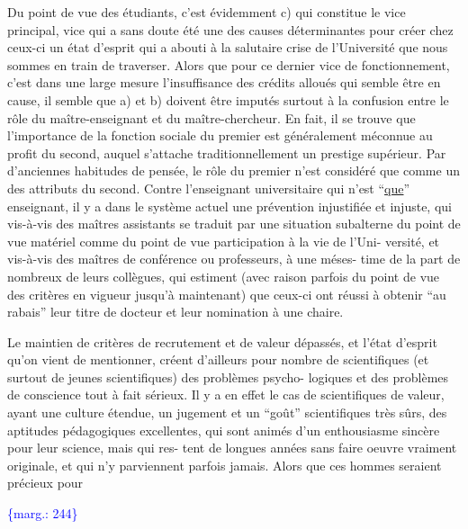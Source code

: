 \documentclass[11pt]{article}
\newcommand{\scanpage}[1]{\par\bigskip\noindent{\small\sffamily[scan #1]}\par}
\newcommand{\mspage}[1]{{\small\sffamily[p.\,#1]}}
\newcommand{\margin}[1]{\textcolor{blue}{\{\textsf{marg.:} #1\}}}
\newcommand{\uline}[1]{\underline{#1}}
\begin{document}
Du point de vue des étudiants, c'est évidemment c) qui constitue
le vice principal, vice qui a sans doute été une des causes déterminantes
pour créer chez ceux-ci un état d'esprit qui a abouti à la salutaire crise
de l'Université que nous sommes en train de traverser. Alors que pour ce
dernier vice de fonctionnement, c'est dans une large mesure l'insuffisance
des crédits alloués qui semble être en cause, il semble que a) et b) doivent
être imputés surtout à la confusion entre le rôle du maître-enseignant et du
maître-chercheur. En fait, il se trouve que l'importance de la fonction
sociale du premier est généralement méconnue au profit du second, auquel
s'attache traditionnellement un prestige supérieur. Par d'anciennes habitudes
de pensée, le rôle du premier n'est considéré que comme un des attributs du
second. Contre l'enseignant universitaire qui n'est ``\uline{que}'' enseignant, il
y a dans le système actuel une prévention injustifiée et injuste, qui
vis-à-vis des maîtres assistants se traduit par une situation subalterne du
point de vue matériel comme du point de vue participation à la vie de l'Uni-%
versité, et vis-à-vis des maîtres de conférence ou professeurs, à une méses-%
time de la part de nombreux de leurs collègues, qui estiment (avec raison
parfois du point de vue des critères en vigueur jusqu'à maintenant) que
ceux-ci ont réussi à obtenir ``au rabais'' leur titre de docteur et leur
nomination à une chaire.

Le maintien de critères de recrutement et de valeur dépassés, et
l'état d'esprit qu'on vient de mentionner, créent d'ailleurs pour nombre
de scientifiques (et surtout de jeunes scientifiques) des problèmes psycho-%
logiques et des problèmes de conscience tout à fait sérieux. Il y a en effet
le cas de scientifiques de valeur, ayant une culture étendue, un jugement
et un ``goût'' scientifiques très sûrs, des aptitudes pédagogiques excellentes,
qui sont animés d'un enthousiasme sincère pour leur science, mais qui res-%
tent de longues années sans faire oeuvre vraiment originale, et qui n'y
parviennent parfois jamais. Alors que ces hommes seraient précieux pour

\margin{244}

\clearpage
\scanpage{119/245}
\mspage{5}
\end{document}
